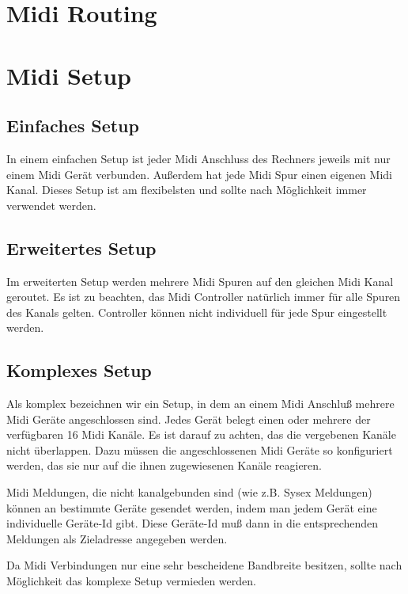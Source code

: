   \section{Midi Routing}

  \section{Midi Setup}
  \subsection{Einfaches Setup}

      In einem einfachen Setup ist jeder Midi Anschluss des Rechners 
      jeweils mit nur einem Midi Gerät verbunden. Außerdem hat jede
      Midi Spur einen eigenen Midi Kanal.
      Dieses Setup ist am flexibelsten und sollte nach Möglichkeit
      immer verwendet werden.

  \subsection{Erweitertes Setup}

      Im erweiterten Setup werden mehrere Midi Spuren auf den gleichen
      Midi Kanal geroutet. Es ist zu beachten, das Midi Controller
      natürlich immer für alle Spuren des Kanals gelten. Controller 
      können nicht individuell für jede Spur eingestellt werden.

  \subsection{Komplexes Setup}
      Als komplex bezeichnen wir ein Setup, in dem an einem Midi Anschluß
      mehrere Midi Geräte angeschlossen sind.
      Jedes Gerät belegt einen oder mehrere der verfügbaren 16 Midi
      Kanäle. Es ist darauf zu achten, das die vergebenen Kanäle nicht
      überlappen. Dazu müssen die angeschlossenen Midi Geräte so 
      konfiguriert werden, das sie nur auf die ihnen zugewiesenen Kanäle
      reagieren.

      Midi Meldungen, die nicht kanalgebunden sind (wie z.B. Sysex 
      Meldungen) können an bestimmte Geräte gesendet werden, indem
      man jedem Gerät eine individuelle Geräte-Id gibt. Diese Geräte-Id
      muß dann in die entsprechenden Meldungen als Zieladresse angegeben
      werden. 

      Da Midi Verbindungen nur eine sehr bescheidene 
      Bandbreite besitzen, sollte nach Möglichkeit das komplexe Setup 
      vermieden werden.
      
